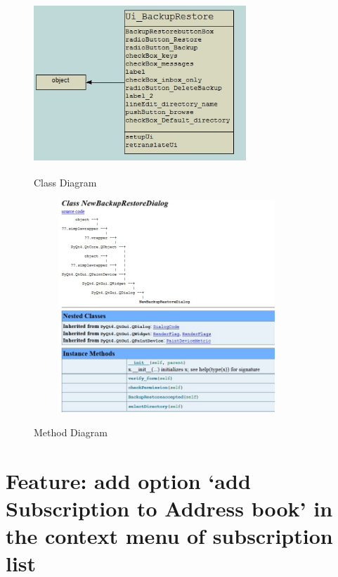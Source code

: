 \documentclass[12pt]{article}
\begin{document}
\begin{figure}[H]
\begin{center}
    {\label{fig:1} \includegraphics[width=8cm,height=6cm]{BakcupRestore.jpg}}   
  \centering  \caption{ Class Diagram } 
  \end{center}
\end{figure}

\begin{figure}[H]
\begin{center}
    {\label{fig:1} \includegraphics[width=10cm,height=8cm]{NewBackupRestoreDialogClass.jpg}}   
  \centering  \caption{Method Diagram}
  \end{center}
\end{figure}


\section{Feature: add option `add Subscription to Address book’  in the context menu of subscription list}
\end{document}
